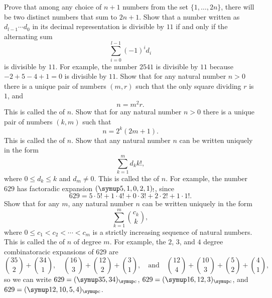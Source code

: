 \begin{routine}
  \exercise Prove that among any choice of $n+1$ numbers from the set $\{1,\ldots, 2n\}$, there will be two distinct numbers that sum to $2n+1$.
  \exercise Show that a number written as $d_{l-1}\cdots d_0$ in its decimal representation is divisible by $11$ if and only if the alternating sum
  \begin{equation*}
    \sum_{i=0}^{l-1}(-1)^{i}d_i
  \end{equation*}
  is divisible by $11$. For example, the number $2541$ is divisible by $11$ because $-2+5-4+1=0$ is divisible by $11$.
  \exercise Show that for any natural number $n>0$ there is a unique pair of numbers $(m,r)$ such that the only square dividing $r$ is $1$, and
  \begin{equation*}
    n = m^2r.
  \end{equation*}
  This is called the  of $n$.
  \exercise Show that for any natural number $n>0$ there is a unique pair of numbers $(k,m)$ such that
  \begin{equation*}
    n = 2^k(2m+1).
  \end{equation*}
  This is called the  of $n$.
  \exercise Show that any natural number $n$ can be written uniquely in the form
  \begin{equation*}
    \sum_{k=1}^m d_k k!,
  \end{equation*}
  where $0\leq d_k\leq k$ and $d_m\neq 0$. This is called the  of $n$. For example, the number $629$ has factoradic expansion $\factoradicnum{5,1,0,2,1}$, since
  \begin{equation*}
    629=5\cdot 5! + 1\cdot 4!+ 0\cdot 3!+ 2\cdot 2! + 1\cdot 1!.
  \end{equation*}
  \exercise Show that for any $m$, any natural number $n$ can be written uniquely in the form
  \begin{equation*}
    \sum_{k=1}^m \binom{c_k}{k},
  \end{equation*}
  where $0\leq c_1<c_2<\cdots <c_m$ is a strictly increasing sequence of natural numbers. This is called the  of $n$ of degree $m$. For example, the $2$\supnd{}, $3$\suprd{}, and $4$\supth{} degree combinatoracic expansions of $629$ are
  \begin{equation*}
    \binom{35}{2}+\binom{34}{1},\quad \binom{16}{3}+\binom{12}{2}+\binom{3}{1},\quad\text{and}\quad \binom{12}{4}+\binom{10}{3}+\binom{5}{2}+\binom{4}{1},
  \end{equation*}
  so we can write $629=\combinatoradicnum{35,34}$, $629=\combinatoradicnum{16,12,3}$, and $629=\combinatoradicnum{12,10,5,4}$.
\end{routine}

